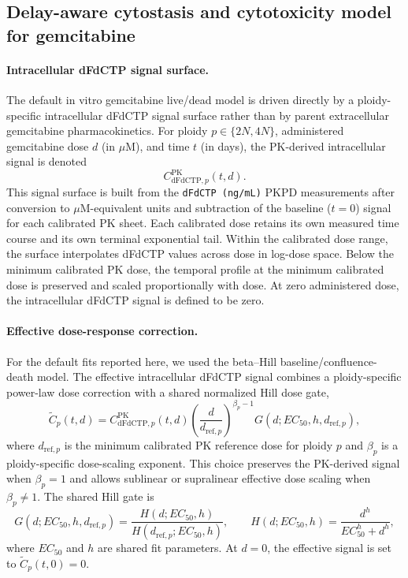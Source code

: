 \subsection*{Delay-aware cytostasis and cytotoxicity model for gemcitabine}

\paragraph{Intracellular dFdCTP signal surface.}
The default in vitro gemcitabine live/dead model is driven directly by a ploidy-specific intracellular dFdCTP signal surface rather than by parent extracellular gemcitabine pharmacokinetics. For ploidy $p\in\{2N,4N\}$, administered gemcitabine dose $d$ (in $\mu$M), and time $t$ (in days), the PK-derived intracellular signal is denoted
\[
C_{\mathrm{dFdCTP},p}^{\mathrm{PK}}(t,d).
\]
This signal surface is built from the \texttt{dFdCTP (ng/mL)} PKPD measurements after conversion to $\mu$M-equivalent units and subtraction of the baseline ($t=0$) signal for each calibrated PK sheet. Each calibrated dose retains its own measured time course and its own terminal exponential tail. Within the calibrated dose range, the surface interpolates dFdCTP values across dose in log-dose space. Below the minimum calibrated PK dose, the temporal profile at the minimum calibrated dose is preserved and scaled proportionally with dose. At zero administered dose, the intracellular dFdCTP signal is defined to be zero.

\paragraph{Effective dose-response correction.}
For the default fits reported here, we used the beta--Hill baseline/confluence-death model. The effective intracellular dFdCTP signal combines a ploidy-specific power-law dose correction with a shared normalized Hill dose gate,
\[
\widetilde{C}_{p}(t,d)
=
C_{\mathrm{dFdCTP},p}^{\mathrm{PK}}(t,d)
\left(\frac{d}{d_{\mathrm{ref},p}}\right)^{\beta_p-1}
G(d;EC_{50},h,d_{\mathrm{ref},p}),
\]
where $d_{\mathrm{ref},p}$ is the minimum calibrated PK reference dose for ploidy $p$ and $\beta_p$ is a ploidy-specific dose-scaling exponent. This choice preserves the PK-derived signal when $\beta_p=1$ and allows sublinear or supralinear effective dose scaling when $\beta_p\neq 1$. The shared Hill gate is
\[
G(d;EC_{50},h,d_{\mathrm{ref},p})
=
\frac{H(d;EC_{50},h)}{H(d_{\mathrm{ref},p};EC_{50},h)},
\qquad
H(d;EC_{50},h)=\frac{d^h}{EC_{50}^h+d^h},
\]
where $EC_{50}$ and $h$ are shared fit parameters. At $d=0$, the effective signal is set to $\widetilde{C}_p(t,0)=0$.

